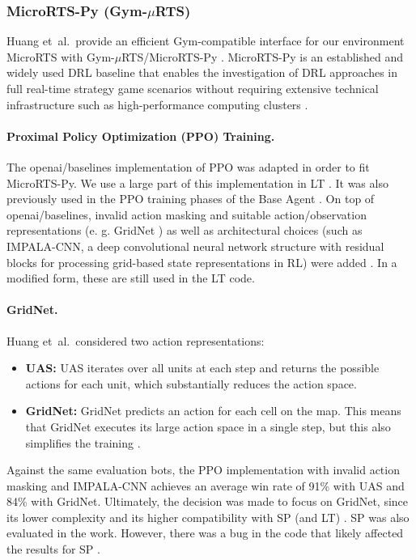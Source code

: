 \documentclass[10pt,twocolumn,letterpaper]{article}
\begin{document}
\subsubsection{MicroRTS-Py (Gym-$\mu$RTS)}
Huang et~al.\ provide an efficient Gym-compatible interface for our environment MicroRTS \cite{Ontanon2013CombinatorialBandit} with Gym-$\mu$RTS/MicroRTS-Py \cite{huang2021gym}.
MicroRTS-Py is an established and widely used DRL baseline that enables the investigation of DRL approaches in full real-time strategy game scenarios without requiring extensive technical infrastructure such as high-performance computing clusters \cite{huang2021gym}.

\paragraph{Proximal Policy Optimization (PPO) Training.}
The openai/baselines \cite{baselines} implementation of PPO was adapted in order to fit MicroRTS-Py. We use a large part of this implementation in LT \cite{huang2021gym}. 
It was also previously used in the PPO training phases of the Base Agent \cite{huft2023microrts}.
On top of openai/baselines, invalid action masking and suitable action/observation representations (e. g. GridNet \cite{pmlr-v97-han19a}) as well as architectural choices (such as IMPALA-CNN, a deep convolutional neural network structure with residual blocks for processing grid-based state representations in RL) \cite{espeholt2018impala} were added \cite{huang2021gym}. 
In a modified form, these are still used in the LT code.

\paragraph{GridNet.}
Huang et~al.\ considered two action representations:
\begin{itemize}
    \item \textbf{UAS:} UAS iterates over all units at each step and returns the possible actions for each unit, which substantially reduces the action space.
    \item \textbf{GridNet:} GridNet predicts an action for each cell on the map. 
    This means that GridNet executes its large action space in a single step, but this also simplifies the training \cite{huang2021gym, pmlr-v97-han19a}.
\end{itemize}
Against the same evaluation bots, the PPO implementation with invalid action masking and IMPALA-CNN achieves an average win rate of 91\% with UAS and 84\% with GridNet. 
Ultimately, the decision was made to focus on GridNet, since its lower complexity and its higher compatibility with SP (and LT) \cite{huang2021gym}.
SP was also evaluated in the work.
However, there was a bug in the code that likely affected the results for SP \cite{goodfriend2024raisocketai}.
\end{document}
